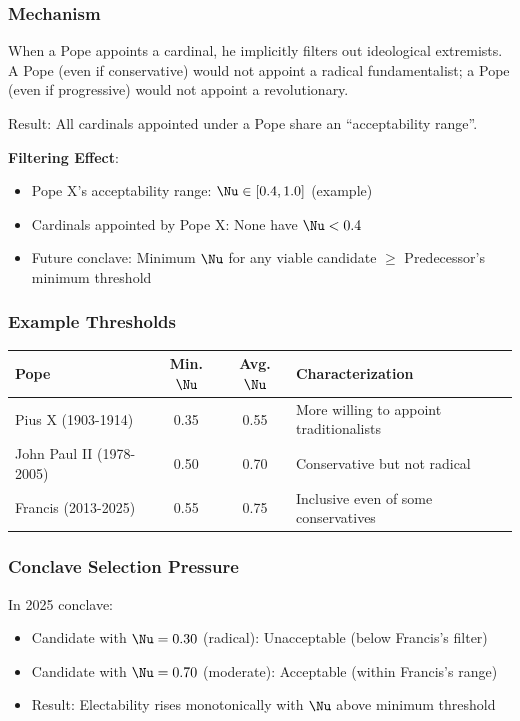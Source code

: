 \subsubsection{Mechanism}

When a Pope appoints a cardinal, he implicitly filters out ideological extremists. A Pope (even if conservative) would not appoint a radical fundamentalist; a Pope (even if progressive) would not appoint a revolutionary.

Result: All cardinals appointed under a Pope share an ``acceptability range''.

\textbf{Filtering Effect}:
\begin{itemize}
\item Pope X's acceptability range: $\Nu \in [0.4, 1.0]$ (example)
\item Cardinals appointed by Pope X: None have $\Nu < 0.4$
\item Future conclave: Minimum $\Nu$ for any viable candidate $\geq$ Predecessor's minimum threshold
\end{itemize}

\subsubsection{Example Thresholds}

\begin{table}[h]
\centering
\begin{tabular}{|l|c|c|l|}
\hline
\textbf{Pope} & \textbf{Min. } $\Nu$ & \textbf{Avg. } $\Nu$ & \textbf{Characterization} \\
\hline
Pius X (1903-1914) & 0.35 & 0.55 & More willing to appoint traditionalists \\
John Paul II (1978-2005) & 0.50 & 0.70 & Conservative but not radical \\
Francis (2013-2025) & 0.55 & 0.75 & Inclusive even of some conservatives \\
\hline
\end{tabular}
\end{table}

\subsubsection{Conclave Selection Pressure}

In 2025 conclave:
\begin{itemize}
\item Candidate with $\Nu = 0.30$ (radical): Unacceptable (below Francis's filter)
\item Candidate with $\Nu = 0.70$ (moderate): Acceptable (within Francis's range)
\item Result: Electability rises monotonically with $\Nu$ above minimum threshold
\end{itemize}

